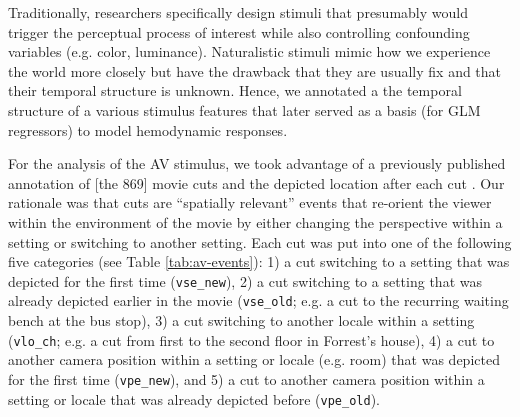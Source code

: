 \documentclass[english]{article}
\begin{document}
Traditionally, researchers specifically design stimuli that presumably would
trigger the perceptual process of interest while also controlling confounding
variables (e.g. color, luminance).
Naturalistic stimuli mimic how we experience the world more closely but have the
drawback that they are usually fix and that their temporal structure is unknown.
Hence, we annotated a the temporal structure of a various stimulus features that
later served as a basis (for GLM regressors) to model hemodynamic responses.

For the analysis of the AV stimulus, we took advantage of a previously published
annotation of [the 869] movie cuts and the depicted location after each cut
\citep{haeusler2016cutanno}.
Our rationale was that cuts are ``spatially relevant'' events that re-orient the
viewer within the environment of the movie by either changing the perspective
within a setting or switching to another setting.
Each cut was put into one of the following five categories (see Table
\ref{tab:av-events}):
%
1) a cut switching to a setting that was depicted for the first time
(\texttt{vse\_new}),
%
2) a cut switching to a setting that was already depicted earlier in the movie
(\texttt{vse\_old}; e.g. a cut to the recurring waiting bench at the bus stop),
%
3) a cut switching to another locale within a setting (\texttt{vlo\_ch}; e.g. a
cut from first to the second floor in Forrest's house),
%
4) a cut to another camera position within a setting or locale (e.g. room) that
was depicted for the first time (\texttt{vpe\_new}), and
%
5) a cut to another camera position within a setting or locale that was already
depicted before (\texttt{vpe\_old}).
\end{document}
